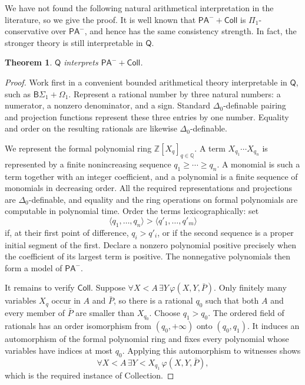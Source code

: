 \documentclass[11pt,a4paper]{article}
\newcommand{\Q}{\mathsf Q}
\newcommand{\PAminus}{\mathsf{PA}^{-}}
\theoremstyle{plain}
\newtheorem{theorem}{Theorem}[section]
\theoremstyle{definition}
\theoremstyle{remark}
\begin{document}
We have not found the following natural arithmetical interpretation in the literature, so we give the proof. It is well known that \(\PAminus+\mathsf{Coll}\) is \(\Pi_1\)-conservative over \(\PAminus\), and hence has the same consistency strength. In fact, the stronger theory is still interpretable in \(\Q\).
\begin{theorem}
  \(\Q\) interprets \(\PAminus+\mathsf{Coll}\).
\end{theorem}
\begin{proof}
  Work first in a convenient bounded arithmetical theory interpretable in \(\Q\), such as \(\mathsf{B}\Sigma_1+\Omega_1\). Represent a rational number by three natural numbers: a numerator, a nonzero denominator, and a sign. Standard \(\Delta_0\)-definable pairing and projection functions represent these three entries by one number. Equality and order on the resulting rationals are likewise \(\Delta_0\)-definable.

  We represent the formal polynomial ring \(\mathbb Z[X_q]_{q\in\mathbb Q}\). A term \(X_{q_1}\cdots X_{q_n}\) is represented by a finite nonincreasing sequence \(q_1\geq\cdots\geq q_n\). A monomial is such a term together with an integer coefficient, and a polynomial is a finite sequence of monomials in decreasing order. All the required representations and projections are \(\Delta_0\)-definable, and equality and the ring operations on formal polynomials are computable in polynomial time. Order the terms lexicographically: set
  \[
  \langle q_1,\ldots,q_n\rangle>
  \langle q'_1,\ldots,q'_m\rangle
  \]
  if, at their first point of difference, \(q_i>q'_i\), or if the second sequence is a proper initial segment of the first. Declare a nonzero polynomial positive precisely when the coefficient of its largest term is positive. The nonnegative polynomials then form a model of \(\PAminus\).

  It remains to verify \(\mathsf{Coll}\). Suppose
  \(\forall X<A\,\exists Y\,\varphi(X,Y,\bar P)\). Only finitely many variables \(X_q\) occur in \(A\) and \(\bar P\), so there is a rational \(q_0\) such that both \(A\) and every member of \(\bar P\) are smaller than \(X_{q_0}\). Choose \(q_1>q_0\). The ordered field of rationals has an order isomorphism from \((q_0,+\infty)\) onto \((q_0,q_1)\). It induces an automorphism of the formal polynomial ring and fixes every polynomial whose variables have indices at most \(q_0\). Applying this automorphism to witnesses shows
  \[
  \forall X<A\,\exists Y<X_{q_1}\,\varphi(X,Y,\bar P),
  \]
  which is the required instance of Collection.
\end{proof}
\end{document}
